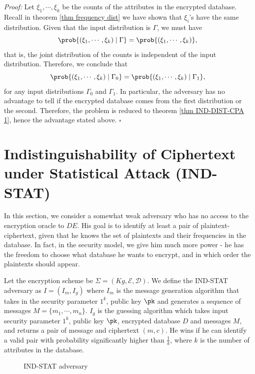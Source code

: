 \textit{Proof:} Let $\xi_1, \cdots, \xi_k$ be the counts of the attributes in the encrypted database. Recall in theorem \ref{thm frequency dist} we have shown that $\xi_i$'s have the same distribution. Given that the input distribution is $\Gamma$, we must have
\begin{equation*}
	\prob{(\xi_1, \cdots, \xi_k) \mid \Gamma} = \prob{(\xi_1, \cdots, \xi_k)},
\end{equation*}
that is, the joint distribution of the counts is independent of the input distribution. Therefore, we conclude that
\begin{equation*}
	\prob{(\xi_1, \cdots, \xi_k) \mid \Gamma_0} = \prob{(\xi_1, \cdots, \xi_k) \mid \Gamma_1},
\end{equation*}
for any input distributions $\Gamma_0$ and $\Gamma_1$. In particular, the adversary has no advantage to tell if the encrypted database comes from the first distribution or the second. Therefore, the problem is reduced to theorem \ref{thm IND-DIST-CPA 1}, hence the advantage stated above. $\square$




\section{Indistinguishability of Ciphertext under Statistical Attack (IND-STAT)}
In this section, we consider a somewhat weak adversary who has no access to the encryption oracle to $DE$. His goal is to identify at least a pair of plaintext-ciphertext, given that he knows the set of plaintexts and their frequencies in the database. In fact, in the security model, we give him much more power - he has the freedom to choose what database he wants to encrypt, and in which order the plaintexts should appear.


Let the encryption scheme be $\Sigma = (Kg, \mathcal{E}, \mathcal{D})$. We define the IND-STAT adversary as $I = (I_m, I_g)$ where $I_m$ is the message generation algorithm that takes in the security parameter $1^k$, public key $\pk$ and generates a sequence of messages $M = \{m_1, \cdots, m_n\}$. $I_g$ is the guessing algorithm which takes input security parameter $1^k$, public key $\pk$, encrypted database $D$ and messages $M$, and returns a pair of message and ciphertext $(m, c)$. He wins if he can identify a valid pair with probability significantly higher than $\frac{1}{k}$, where $k$ is the number of attributes in the database.
\begin{figure}[H]
	\begin{center}
	\end{center}
	\caption{IND-STAT adversary}
\end{figure}

